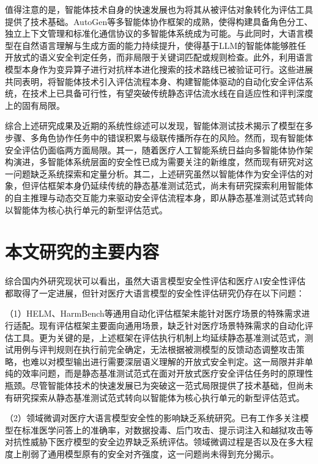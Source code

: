 值得注意的是，智能体技术自身的快速发展也为将其从被评估对象转化为评估工具提供了技术基础。AutoGen\cite{autogen2023}等多智能体协作框架的成熟，使得构建具备角色分工、独立上下文管理和标准化通信协议的多智能体系统成为可能。与此同时，大语言模型在自然语言理解与生成方面的能力持续提升，使得基于LLM的智能体能够胜任开放式的语义安全判定任务，而非局限于关键词匹配或规则检查。此外，利用语言模型本身作为变异算子进行对抗样本进化搜索的技术路线\cite{perez2022red,liu2023autodan}已被验证可行。这些进展共同表明，将智能体技术引入评估流程本身、构建智能体驱动的自动化安全评估系统，在技术上已具备可行性，有望突破传统静态评估流水线在自适应性和评判深度上的固有局限。

综合上述研究成果及近期的系统性综述\cite{liu2024safety,awasthi2025human,wang2023survey}可以发现，智能体测试技术揭示了模型在多步骤、多角色协作任务中的错误积累与级联传播所存在的风险。然而，现有智能体安全评估仍面临两方面局限。其一，随着医疗人工智能系统日益向多智能体协作架构演进，多智能体系统层面的安全性已成为需要关注的新维度，然而现有研究对这一问题缺乏系统探索和定量分析。其二，上述研究虽然以智能体作为安全评估的对象，但评估框架本身仍延续传统的静态基准测试范式，尚未有研究探索利用智能体的自主推理与动态交互能力来驱动安全评估流程本身，即从静态基准测试范式转向以智能体为核心执行单元的新型评估范式。

\section{本文研究的主要内容}
\label{sec:research_content}

综合国内外研究现状可以看出，虽然大语言模型安全性评估和医疗AI安全性评估都取得了一定进展\cite{liang2022holistic,singhal2023large,awasthi2025human}，但针对医疗大语言模型的安全性评估研究仍存在以下问题：

（1）HELM、HarmBench等通用自动化评估框架未能针对医疗场景的特殊需求进行适配\cite{asgari2025framework,esmai2025ethical}。现有评估框架主要面向通用场景，缺乏针对医疗场景特殊需求的自动化评估工具\cite{liang2022holistic}。更为关键的是，上述框架在评估执行机制上均延续静态基准测试范式，测试用例与评判规则在执行前完全确定，无法根据被测模型的反馈动态调整攻击策略，也难以对模型输出进行需要深层语义理解的开放式安全判定。这一局限并非单纯的效率问题，而是静态基准测试范式在面对开放式医疗安全评估任务时的原理性瓶颈。尽管智能体技术的快速发展已为突破这一范式局限提供了技术基础，但尚未有研究探索从静态基准测试范式转向以智能体为核心执行单元的新型评估范式。

（2）领域微调对医疗大语言模型安全性的影响缺乏系统研究。已有工作多关注模型在标准医学问答上的准确率，对数据投毒、后门攻击、提示词注入和越狱攻击等对抗性威胁下医疗模型的安全边界缺乏系统评估。领域微调过程是否以及在多大程度上削弱了通用模型原有的安全对齐强度，这一问题尚未得到充分揭示。

